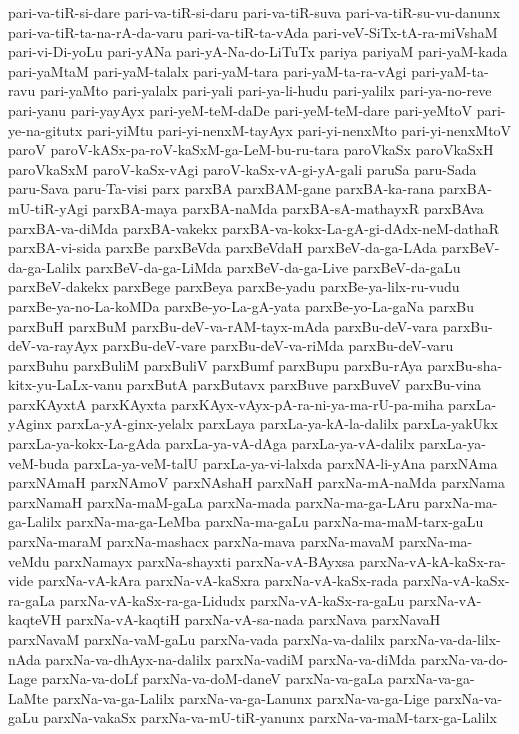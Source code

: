 {pari-va-tiR-si-dare
pari-va-tiR-si-daru
pari-va-tiR-suva
pari-va-tiR-su-vu-danunx
pari-va-tiR-ta-na-rA-da-varu
pari-va-tiR-ta-vAda
pari-veV-SiTx-tA-ra-miVshaM
pari-vi-Di-yoLu
pari-yANa
pari-yA-Na-do-LiTuTx
pariya
pariyaM
pari-yaM-kada
pari-yaMtaM
pari-yaM-talalx
pari-yaM-tara
pari-yaM-ta-ra-vAgi
pari-yaM-ta-ravu
pari-yaMto
pari-yalalx
pari-yali
pari-ya-li-hudu
pari-yalilx
pari-ya-no-reve
pari-yanu
pari-yayAyx
pari-yeM-teM-daDe
pari-yeM-teM-dare
pari-yeMtoV
pari-ye-na-gitutx
pari-yiMtu
pari-yi-nenxM-tayAyx
pari-yi-nenxMto
pari-yi-nenxMtoV
paroV
paroV-kASx-pa-roV-kaSxM-ga-LeM-bu-ru-tara
paroVkaSx
paroVkaSxH
paroVkaSxM
paroV-kaSx-vAgi
paroV-kaSx-vA-gi-yA-gali
paruSa
paru-Sada
paru-Sava
paru-Ta-visi
parx
parxBA
parxBAM-gane
parxBA-ka-rana
parxBA-mU-tiR-yAgi
parxBA-maya
parxBA-naMda
parxBA-sA-mathayxR
parxBAva
parxBA-va-diMda
parxBA-vakekx
parxBA-va-kokx-La-gA-gi-dAdx-neM-dathaR
parxBA-vi-sida
parxBe
parxBeVda
parxBeVdaH
parxBeV-da-ga-LAda
parxBeV-da-ga-Lalilx
parxBeV-da-ga-LiMda
parxBeV-da-ga-Live
parxBeV-da-gaLu
parxBeV-dakekx
parxBege
parxBeya
parxBe-yadu
parxBe-ya-lilx-ru-vudu
parxBe-ya-no-La-koMDa
parxBe-yo-La-gA-yata
parxBe-yo-La-gaNa
parxBu
parxBuH
parxBuM
parxBu-deV-va-rAM-tayx-mAda
parxBu-deV-vara
parxBu-deV-va-rayAyx
parxBu-deV-vare
parxBu-deV-va-riMda
parxBu-deV-varu
parxBuhu
parxBuliM
parxBuliV
parxBumf
parxBupu
parxBu-rAya
parxBu-sha-kitx-yu-LaLx-vanu
parxButA
parxButavx
parxBuve
parxBuveV
parxBu-vina
parxKAyxtA
parxKAyxta
parxKAyx-vAyx-pA-ra-ni-ya-ma-rU-pa-miha
parxLa-yAginx
parxLa-yA-ginx-yelalx
parxLaya
parxLa-ya-kA-la-dalilx
parxLa-yakUkx
parxLa-ya-kokx-La-gAda
parxLa-ya-vA-dAga
parxLa-ya-vA-dalilx
parxLa-ya-veM-buda
parxLa-ya-veM-talU
parxLa-ya-vi-lalxda
parxNA-li-yAna
parxNAma
parxNAmaH
parxNAmoV
parxNAshaH
parxNaH
parxNa-mA-naMda
parxNama
parxNamaH
parxNa-maM-gaLa
parxNa-mada
parxNa-ma-ga-LAru
parxNa-ma-ga-Lalilx
parxNa-ma-ga-LeMba
parxNa-ma-gaLu
parxNa-ma-maM-tarx-gaLu
parxNa-maraM
parxNa-mashacx
parxNa-mava
parxNa-mavaM
parxNa-ma-veMdu
parxNamayx
parxNa-shayxti
parxNa-vA-BAyxsa
parxNa-vA-kA-kaSx-ra-vide
parxNa-vA-kAra
parxNa-vA-kaSxra
parxNa-vA-kaSx-rada
parxNa-vA-kaSx-ra-gaLa
parxNa-vA-kaSx-ra-ga-Lidudx
parxNa-vA-kaSx-ra-gaLu
parxNa-vA-kaqteVH
parxNa-vA-kaqtiH
parxNa-vA-sa-nada
parxNava
parxNavaH
parxNavaM
parxNa-vaM-gaLu
parxNa-vada
parxNa-va-dalilx
parxNa-va-da-lilx-nAda
parxNa-va-dhAyx-na-dalilx
parxNa-vadiM
parxNa-va-diMda
parxNa-va-do-Lage
parxNa-va-doLf
parxNa-va-doM-daneV
parxNa-va-gaLa
parxNa-va-ga-LaMte
parxNa-va-ga-Lalilx
parxNa-va-ga-Lanunx
parxNa-va-ga-Lige
parxNa-va-gaLu
parxNa-vakaSx
parxNa-va-mU-tiR-yanunx
parxNa-va-maM-tarx-ga-Lalilx
}
